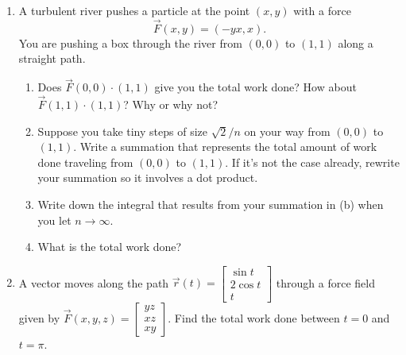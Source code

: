 \documentclass[letter]{article}
\newcommand{\mat}[1]{\begin{bmatrix}#1\end{bmatrix}}
\begin{document}
	\begin{enumerate}[resume]
		\item A turbulent river pushes a particle at the point $(x,y)$ with a force
			\[
				\vec F(x,y) = (-yx,x).
			\]
			You are pushing a box through the river from $(0,0)$ to $(1,1)$ along a 
			straight path.
			\begin{enumerate}
				\item Does $\vec F(0,0)\cdot (1,1)$ give you the total work done?
					How about $\vec F(1,1)\cdot (1,1)$?  Why or why not?
				\item Suppose you take tiny steps of size $\sqrt{2}/n$ on your way
					from $(0,0)$ to $(1,1)$.  Write a summation that
					represents the total amount of work done traveling
					from $(0,0)$ to $(1,1)$.  If it's not the case already,
					rewrite your summation so it involves a dot product.
				\item Write down the integral that results from your summation in
					(b) when you let $n\to \infty$.
				\item What is the total work done?
			\end{enumerate}
		
		\item A vector moves along the path $\vec r(t) = \mat{\sin t\\ 2\cos t\\ t}$ through a force field given by
			$\vec F(x,y,z)=\mat{yz\\ xz\\ xy}$.  Find the total work done between $t=0$ and $t=\pi$.

	\end{enumerate}
\end{document}
